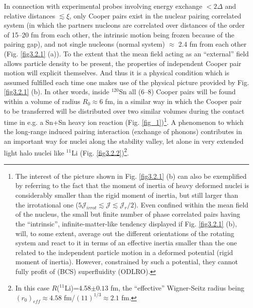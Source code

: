  In connection with experimental probes involving energy exchange $<2\Delta$ and relative distances $\lesssim\xi$, only Cooper pairs exist
 in the nuclear pairing correlated system   (in which the partners nucleons are correlated over distances of the order of 15--20 fm from each other, the intrinsic motion being frozen because of the pairing gap), and not single nucleons (normal system)  $\approx$ 2.4 fm  from each other (Fig. \ref{fig3.2.1} (a)). To the extent that the mean field acting as an ``external'' field allows particle density to be present, the properties of independent Cooper pair motion will explicit themselves. And thus it is a physical condition which is assumed fulfilled each time one  makes use of the physical picture provided by Fig. \ref{fig3.2.1} (b). In other words, inside $^{120}$Sn all (6--8) Cooper pairs will be found within a volume of radius $R_0\approx 6$ fm, in a similar way in which the Cooper pair to be transferred will be distributed over two similar volumes during the contact time  in e.g. a Sn+Sn heavy ion reaction (Fig. \ref{fig_1})\footnote{The interest of the  picture shown in Fig. \ref{fig3.2.1} (b) can also be exemplified by referring to the fact that the moment of inertia of heavy deformed nuclei is considerably smaller than the rigid moment of inertia, but still larger than the irrotational one ($5\mathcal J_{irrot}\lesssim\mathcal J\lesssim  \mathcal J_r/2$). Even confined within the mean field of the nucleus, the small but finite number   of phase correlated pairs having the ``intrinsic'', infinite-matter-like tendency displayed if Fig. \ref{fig3.2.1} (b), will, to some extent, average out the different orientations of the rotating system and react to it in terms of an effective inertia smaller than the one related to the independent particle motion in a deformed potential (rigid moment of inertia). However, constrained by such a potential, they cannot fully profit of (BCS)  superfluidity (ODLRO).}.  A phenomenon to which the long-range induced pairing interaction (exchange of phonons) contributes in an important way for nuclei along the stability valley, let alone in very extended light halo nuclei like $^{11}$Li (Fig. \ref{fig3.2.2})\footnote{In this case $R$($^{11}$Li)=4.58$\pm0.13$ fm, the ``effective'' Wigner-Seitz radius being $(r_0)_{eff}\approx 4.58$ fm/$(11)^{1/3}\approx2.1$ fm.}.

